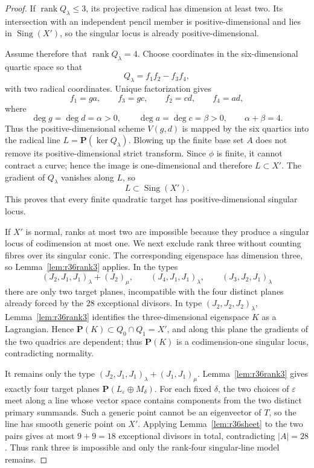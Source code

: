 \documentclass[11pt,reqno]{amsart}
\theoremstyle{remark}
\newcommand{\PP}{\mathbf P}
\begin{document}
\begin{proof}
If $\operatorname{rank}Q_\lambda\le3$, its projective radical has dimension at least two.  Its intersection with an independent pencil member is positive-dimensional and lies in $\operatorname{Sing}(X')$, so the singular locus is already positive-dimensional.

Assume therefore that $\operatorname{rank}Q_\lambda=4$.  Choose coordinates in the six-dimensional quartic space so that
\[
Q_\lambda=f_1f_2-f_3f_4,
\]
with two radical coordinates.  Unique factorization gives
\[
f_1=ga,\qquad f_3=gc,\qquad f_2=cd,\qquad f_4=ad,
\]
where
\[
\deg g=\deg d=\alpha>0,
\qquad
\deg a=\deg c=\beta>0,
\qquad
\alpha+\beta=4.
\]
Thus the positive-dimensional scheme $V(g,d)$ is mapped by the six quartics into the radical line $L=\PP(\ker Q_\lambda)$.  Blowing up the finite base set $A$ does not remove its positive-dimensional strict transform.  Since $\phi$ is finite, it cannot contract a curve; hence the image is one-dimensional and therefore $L\subset X'$.  The gradient of $Q_\lambda$ vanishes along $L$, so
\[
L\subset\operatorname{Sing}(X').
\]
This proves that every finite quadratic target has positive-dimensional singular locus.

If $X'$ is normal, ranks at most two are impossible because they produce a singular locus of codimension at most one.  We next exclude rank three without counting fibres over its singular conic.  The corresponding eigenspace has dimension three, so Lemma~\ref{lem:r36rank3} applies.  In the types
\[
(J_2,J_1,J_1)_\lambda+(J_2)_\mu,
\qquad
(J_4,J_1,J_1)_\lambda,
\qquad
(J_3,J_2,J_1)_\lambda
\]
there are only two target planes, incompatible with the four distinct planes already forced by the $28$ exceptional divisors.  In type $(J_2,J_2,J_2)_\lambda$, Lemma~\ref{lem:r36rank3} identifies the three-dimensional eigenspace $K$ as a Lagrangian.  Hence $\PP(K)\subset Q_0\cap Q_1=X'$, and along this plane the gradients of the two quadrics are dependent; thus $\PP(K)$ is a codimension-one singular locus, contradicting normality.

It remains only the type $(J_2,J_1,J_1)_\lambda+(J_1,J_1)_\mu$.  Lemma~\ref{lem:r36rank3} gives exactly four target planes $\PP(L_\varepsilon\oplus M_\delta)$.  For each fixed $\delta$, the two choices of $\varepsilon$ meet along a line whose vector space contains components from the two distinct primary summands.  Such a generic point cannot be an eigenvector of $T$, so the line has smooth generic point on $X'$.  Applying Lemma~\ref{lem:r36sheet} to the two pairs gives at most $9+9=18$ exceptional divisors in total, contradicting $|A|=28$.  Thus rank three is impossible and only the rank-four singular-line model remains.


\end{proof}
\end{document}
